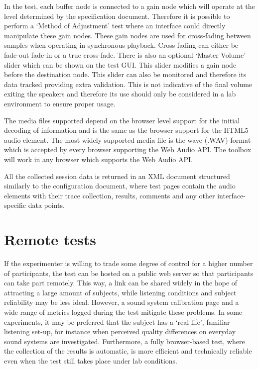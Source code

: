 \documentclass{sig-alternate}
\begin{document}
    In the test, each buffer node is connected to a gain node which will operate at the level determined by the specification document. Therefore it is possible to perform a `Method of Adjustment' test where an interface could directly manipulate these gain nodes. These gain nodes are used for cross-fading between samples when operating in synchronous playback. Cross-fading can either be fade-out fade-in or a true cross-fade. There is also an optional `Master Volume' slider which can be shown on the test GUI. This slider modifies a gain node before the destination node. This slider can also be monitored and therefore its data tracked providing extra validation. This is not indicative of the final volume exiting the speakers and therefore its use should only be considered in a lab environment to ensure proper usage.
    
    The media files supported depend on the browser level support for the initial decoding of information and is the same as the browser support for the HTML5 audio element. The most widely supported media file is the wave (.WAV) format which is accepted by every browser supporting the Web Audio API. The toolbox will work in any browser which supports the Web Audio API.
    
    All the collected session data is returned in an XML document structured similarly to the configuration document, where test pages contain the audio elements with their trace collection, results, comments and any other interface-specific data points.
    
\section{Remote tests} %
	\label{sec:remote}

	If the experimenter is willing to trade some degree of control for a higher number of participants, the test can be hosted on a public web server so that participants can take part remotely. This way, a link can be shared widely in the hope of attracting a large amount of subjects, while listening conditions and subject reliability may be less ideal. However, a sound system calibration page and a wide range of metrics logged during the test mitigate these problems. In some experiments, it may be preferred that the subject has a `real life', familiar listening set-up, for instance when perceived quality differences on everyday sound systems are investigated. 
	Furthermore, a fully browser-based test, where the collection of the results is automatic, is more efficient and technically reliable even when the test still takes place under lab conditions.
\end{document}
